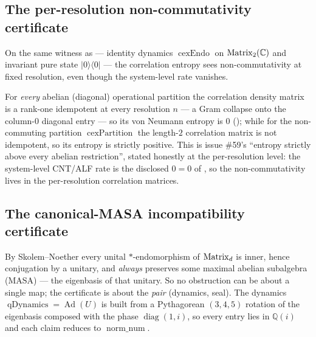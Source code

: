 \subsection{The per-resolution non-commutativity certificate}\label{sec:cnt-noncommutative}

On the same witness as  --- identity dynamics \(\operatorname{cexEndo}\)
on \(\operatorname{Matrix}_2(\mathbb{C})\) and invariant pure state \(|0\rangle\langle 0|\) --- the correlation entropy sees
non-commutativity at fixed resolution, even though the system-level rate vanishes.

\begin{theorem}\label{cex_strictly_above_abelian}
  \leanok
  For \emph{every} abelian (diagonal) operational partition the correlation density matrix is a
  rank-one idempotent at every resolution \(n\) --- a Gram collapse onto the column-\(0\) diagonal
  entry --- so its von Neumann entropy is \(0\)
  (); while for the
  non-commuting partition \(\operatorname{cexPartition}\) the length-\(2\) correlation matrix is not
  idempotent, so its entropy is strictly positive. This is issue \#59's ``entropy strictly above every
  abelian restriction'', stated honestly at the per-resolution level: the system-level CNT/ALF rate
  is the disclosed \(0 = 0\) of , so the non-commutativity lives in
  the per-resolution correlation matrices.
\end{theorem}

\subsection{The canonical-MASA incompatibility certificate}\label{sec:masa-certificate}

By Skolem--Noether every unital \(*\)-endomorphism of \(\operatorname{Matrix}_d\) is inner, hence conjugation by a
unitary, and \emph{always} preserves some maximal abelian subalgebra (MASA) --- the eigenbasis of
that unitary. So no obstruction can be about a single map; the certificate is about the \emph{pair}
(dynamics, seal). The dynamics \(\operatorname{qDynamics} = \operatorname{Ad}(U)\) is built from a
Pythagorean \((3,4,5)\) rotation of the eigenbasis composed with the phase \(\operatorname{diag}(1,i)\),
so every entry lies in \(\mathbb{Q}(i)\) and each claim reduces to \(\operatorname{norm\_num}\).

